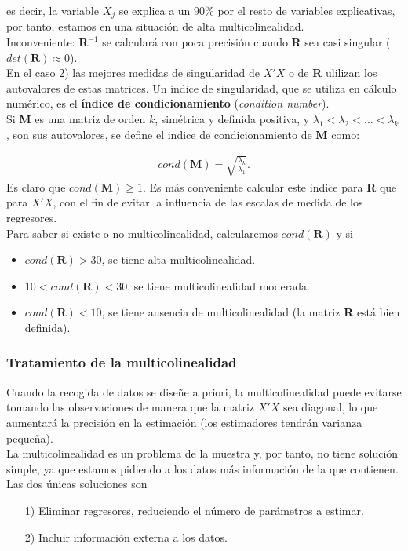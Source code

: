 es decir, la variable $X_j$ se explica a un $90\%$ por el resto de variables explicativas, por tanto, estamos en una situación de alta multicolinealidad.
\\
\newline
Inconveniente: $\textbf{R}^{-1}$ se calculará con poca precisión cuando \textbf{R} sea casi singular ($det(\textbf{R}) \approx 0$).
\\
\newline
En el caso 2) las mejores medidas de singularidad de $X'X$ o de \textbf{R} ulilizan los autovalores de estas matrices. Un índice de singularidad, que se utiliza en cálculo numérico, es el \textbf{índice de condicionamiento} (\textit{condition number}).
\\
\newline
Si \textbf{M} es una matriz de orden $k$, simétrica y definida positiva, y $\lambda_1 < \lambda_2 < \ldots < \lambda_k$, son sus autovalores, se define el indice de condicionamiento de \textbf{M} como:

\begin{align*}
    cond(\textbf{M}) = \sqrt{\frac{\lambda_k}{\lambda_1}}.
\end{align*}
Es claro que $cond(\textbf{M}) \ge 1$. Es más conveniente calcular este indice para \textbf{R} que para $X'X$, con el fin de evitar la influencia de las escalas de medida de los regresores.
\\
\newline
Para saber si existe o no multicolinealidad, calcularemos $cond(\textbf{R})$ y si
\begin{itemize}
    \item $cond(\textbf{R}) > 30$, se tiene alta multicolinealidad.
    \item $10 < cond(\textbf{R}) < 30$, se tiene multicolinealidad moderada.
    \item $cond(\textbf{R}) < 10$, se tiene ausencia de multicolinealidad (la matriz \textbf{R} está bien definida).
\end{itemize}

\subsubsection{Tratamiento de la multicolinealidad}
\noindent Cuando la recogida de datos se diseñe a priori, la multicolinealidad puede evitarse
tomando las observaciones de manera que la matriz $X'X$ sea diagonal, lo que
aumentará la precisión en la estimación (los estimadores tendrán varianza pequeña).
\\
\newline
La multicolinealidad es un problema de la muestra y, por tanto, no tiene solución
simple, ya que estamos pidiendo a los datos más información de la que contienen.
\\
\newline
Las dos únicas soluciones son
\begin{enumerate}
    \item[1)] Eliminar regresores, reduciendo el número de parámetros a estimar.
    \item[2)] Incluir información externa a los datos.
\end{enumerate}

